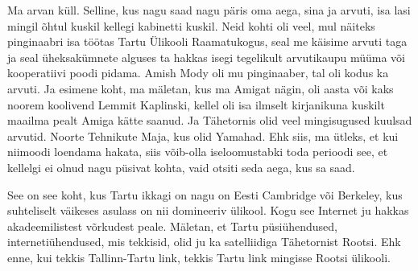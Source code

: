 
Ma arvan küll. Selline, kus nagu saad nagu päris oma aega, sina ja arvuti, isa 
lasi  mingil õhtul kuskil kellegi kabinetti kuskil. Neid kohti oli veel, mul 
näiteks pinginaabri isa töötas Tartu Ülikooli Raamatukogus, seal me käisime arvuti taga ja seal üheksakümnete alguses 
ta hakkas isegi tegelikult arvutikaupu müüma või kooperatiivi poodi pidama. 
Amish Mody oli mu pinginaaber, tal oli kodus ka arvuti. 
Ja esimene koht, ma mäletan, kus ma Amigat nägin, oli aasta või kaks noorem 
koolivend Lemmit Kaplinski, kellel oli isa 
ilmselt  kirjanikuna kuskilt maailma pealt Amiga kätte saanud. Ja 
Tähetornis olid veel mingisugused  kuulsad arvutid. 
Noorte Tehnikute Maja, kus olid 
Yamahad. Ehk siis, ma ütleks, et kui niimoodi loendama hakata, siis võib-olla 
iseloomustabki toda perioodi see, et kellelgi ei olnud nagu püsivat kohta, vaid 
otsiti seda aega, kus sa saad.


See on see koht, kus Tartu ikkagi on nagu on Eesti Cambridge või Berkeley, kus 
suhteliselt väikeses asulass on nii domineeriv ülikool. Kogu see Internet ju 
hakkas akadeemilistest võrkudest peale. Mäletan, et  Tartu püsiühendused, 
internetiühendused, mis tekkisid, olid ju ka  satelliidiga Tähetornist Rootsi. 
Ehk enne, kui tekkis Tallinn-Tartu link, tekkis Tartu link mingisse Rootsi 
ülikooli. 


